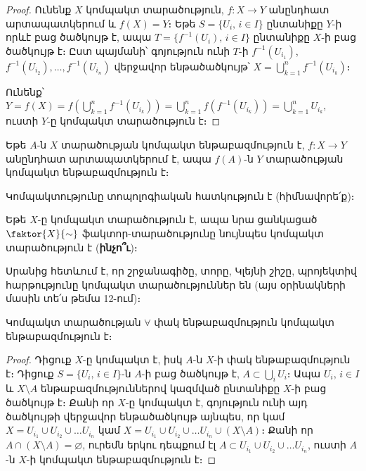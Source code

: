 \documentclass[./main.tex]{subfiles}
\begin{document}
\begin{proof}
Ունենք $X$ կոմպակտ տարածություն, $f:X\rightarrow Y$ անընդհատ արտապատկերում և ${f(X)=Y}$։ Եթե $S=\{U_i,\, i\in I\}$ ընտանիքը $Y$-ի որևէ բաց ծածկույթ է, ապա ${T=\{f^{-1}(U_i),\, i\in I\} }$  ընտանիքը $X$-ի բաց ծածկույթ է։ Ըստ պայ\-մանի՝ գոյություն ունի $T$-ի ${f^{-1}(U_{i_1})}$, ${f^{-1}(U_{i_2}), \dots , f^{-1}(U_{i_n})}$ վերջավոր ենթածած\-կույթ՝ $X=\bigcup\limits_{k=1}^n f^{-1}(U_{i_k})$։

\par Ունենք՝ $Y= f(X)=f\left(\bigcup\limits_{k=1}^n f^{-1}(U_{i_k})\right)=\bigcup\limits_{k=1}^n f(f^{-1}(U_{i_k}))=\bigcup\limits_{k=1}^nU_{i_k}$, ուստի $Y$-ը կոմպակտ տարածություն է։
\end{proof}

\begin{hetevanq_counter}\label{ch16cor1}
Եթե $A$-ն $X$ տարածության կոմպակտ ենթաբազմություն է, ${f:X\rightarrow Y}$ անընդհատ արտապատկերում է, ապա $f(A)$-ն $Y$ տարածության կոմպակտ են\-թա\-բազ\-մու\-թյուն է։
\end{hetevanq_counter} %
\begin{hetevanq_counter}\label{ch16cor2}
Կոմպակտությունը տոպոլոգիական հատկություն է (հիմնավորե՛ք)։
\end{hetevanq_counter} %
\begin{hetevanq_counter}\label{ch16cor3}
Եթե $X$-ը կոմպակտ տարածություն է, ապա նրա ցանկացած $\faktor{X}{\sim}$ ֆակտոր-տարածությունը նույնպես կոմպակտ տարածություն է (\textbf{ինչո՞ւ})։
\end{hetevanq_counter} %

\par Սրանից հետևում է, որ շրջանագիծը, տորը, Կլեյնի շիշը, պրոյեկտիվ հար\-թու\-թ\-յունը կոմպակտ տարածություններ են (այս օրինակների մասին տե՛ս թեմա 12-ում)։

\begin{theorem}\label{ch16thm4}
Կոմպակտ տարածության $\forall$ փակ ենթաբազմություն կոմպակտ \linebreak ենթա\-բազմություն է։
\end{theorem}

\begin{proof}
Դիցուք $X$-ը կոմպակտ է, իսկ $A$-ն $X$-ի փակ ենթաբազմություն է։ Դիցուք $S=\{ U_i,\, i\in I\} $-ն $A$-ի բաց ծածկույթ է, $A\subset \bigcup\limits_i U_i$։ Ապա $U_i,\, i\in I$ և $X\setminus A$ ենթաբազմություններով կազմված ընտանիքը $X$-ի բաց ծածկույթ է։ Քանի որ $X$-ը կոմպակտ է, գոյություն ունի այդ ծածկույթի վերջավոր ենթածածկույթ այնպես, որ կամ $X=U_{i_1}\cup U_{i_2}\cup \dots U_{i_n}$ կամ $X=U_{i_1}\cup U_{i_2}\cup \dots U_{i_n}\cup(X\setminus A)$։ Քանի որ $A \cap (X \setminus A) = \varnothing$, ուրեմն երկու դեպքում էլ $A\subset U_{i_1}\cup U_{i_2}\cup \dots U_{i_n}$, ուստի $A$-ն $X$-ի կոմպակտ ենթաբազմություն է։
\end{proof}
\end{document}
